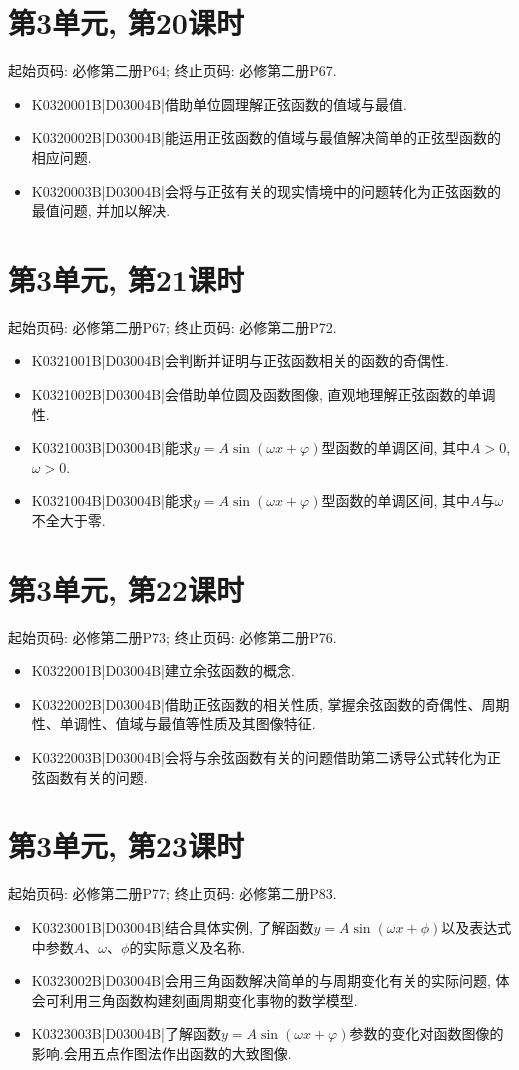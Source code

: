 \section*{第3单元, 第20课时}
起始页码: 必修第二册P64; 终止页码: 必修第二册P67.
\begin{itemize}
\item K0320001B|D03004B|借助单位圆理解正弦函数的值域与最值.
\item K0320002B|D03004B|能运用正弦函数的值域与最值解决简单的正弦型函数的相应问题.
\item K0320003B|D03004B|会将与正弦有关的现实情境中的问题转化为正弦函数的最值问题, 并加以解决.
\end{itemize}

\section*{第3单元, 第21课时}
起始页码: 必修第二册P67; 终止页码: 必修第二册P72.
\begin{itemize}
\item K0321001B|D03004B|会判断并证明与正弦函数相关的函数的奇偶性.
\item K0321002B|D03004B|会借助单位圆及函数图像, 直观地理解正弦函数的单调性.
\item K0321003B|D03004B|能求$y=A\sin(\omega x+\varphi)$型函数的单调区间, 其中$A>0$, $\omega>0$.
\item K0321004B|D03004B|能求$y=A\sin(\omega x+\varphi)$型函数的单调区间, 其中$A$与$\omega$不全大于零.
\end{itemize}

\section*{第3单元, 第22课时}
起始页码: 必修第二册P73; 终止页码: 必修第二册P76.
\begin{itemize}
\item K0322001B|D03004B|建立余弦函数的概念.
\item K0322002B|D03004B|借助正弦函数的相关性质, 掌握余弦函数的奇偶性、周期性、单调性、值域与最值等性质及其图像特征.
\item K0322003B|D03004B|会将与余弦函数有关的问题借助第二诱导公式转化为正弦函数有关的问题.
\end{itemize}

\section*{第3单元, 第23课时}
起始页码: 必修第二册P77; 终止页码: 必修第二册P83.
\begin{itemize}
\item K0323001B|D03004B|结合具体实例, 了解函数$y=A\sin(\omega x+\phi)$以及表达式中参数$A$、$\omega$、$\phi$的实际意义及名称.
\item K0323002B|D03004B|会用三角函数解决简单的与周期变化有关的实际问题, 体会可利用三角函数构建刻画周期变化事物的数学模型.
\item K0323003B|D03004B|了解函数$y=A\sin(\omega x+\varphi)$参数的变化对函数图像的影响.会用五点作图法作出函数的大致图像.
\end{itemize}

